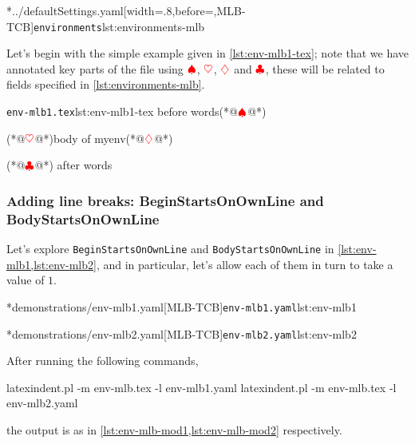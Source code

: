 	\cmhlistingsfromfile[style=modifylinebreaksEnv]*{../defaultSettings.yaml}[width=.8\linewidth,before=\centering,MLB-TCB]{\texttt{environments}}{lst:environments-mlb}

	Let's begin with the simple example given in \cref{lst:env-mlb1-tex}; note that we
	have annotated key parts of the file using $\color{red}\spadesuit$,
	$\color{red}\heartsuit$, $\color{red}\diamondsuit$ and $\color{red}\clubsuit$,
	these will be related to fields specified in \cref{lst:environments-mlb}.

	\begin{cmhlistings}[style=tcblatex,escapeinside={(*@}{@*)}]{\texttt{env-mlb1.tex}}{lst:env-mlb1-tex}
before words(*@$\color{red}\spadesuit$@*) \begin{myenv}(*@$\color{red}\heartsuit$@*)body of myenv(*@$\color{red}\diamondsuit$@*)\end{myenv}(*@$\color{red}\clubsuit$@*) after words
\end{cmhlistings}

\subsubsection{Adding line breaks: BeginStartsOnOwnLine and BodyStartsOnOwnLine}
	Let's explore \texttt{BeginStartsOnOwnLine} and \texttt{BodyStartsOnOwnLine} in
	\cref{lst:env-mlb1,lst:env-mlb2}, and in particular, let's allow each of them in turn to take
	a value of $1$.

	\begin{minipage}{.45\textwidth}
		\cmhlistingsfromfile[style=yaml-LST]*{demonstrations/env-mlb1.yaml}[MLB-TCB]{\texttt{env-mlb1.yaml}}{lst:env-mlb1}
	\end{minipage}
	\hfill
	\begin{minipage}{.45\textwidth}
		\cmhlistingsfromfile[style=yaml-LST]*{demonstrations/env-mlb2.yaml}[MLB-TCB]{\texttt{env-mlb2.yaml}}{lst:env-mlb2}
	\end{minipage}

	After running the following commands,
	\begin{commandshell}
latexindent.pl -m env-mlb.tex -l env-mlb1.yaml
latexindent.pl -m env-mlb.tex -l env-mlb2.yaml
\end{commandshell}
	the output is as in \cref{lst:env-mlb-mod1,lst:env-mlb-mod2} respectively.

	\begin{widepage}
		\begin{minipage}{.56\linewidth}
		\end{minipage}
		\hfill
		\begin{minipage}{.43\linewidth}
		\end{minipage}
	\end{widepage}

